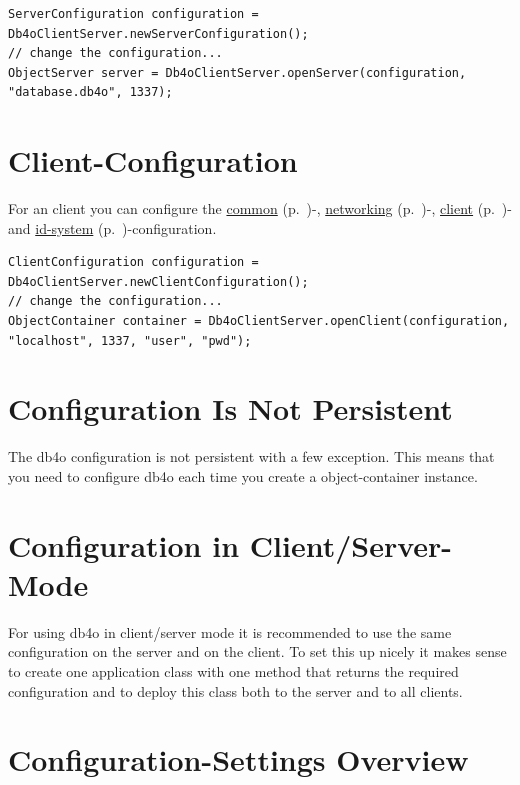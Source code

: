 \begin{lstlisting}
ServerConfiguration configuration = Db4oClientServer.newServerConfiguration();
// change the configuration...
ObjectServer server = Db4oClientServer.openServer(configuration, "database.db4o", 1337);
\end{lstlisting}

\section*{Client-Configuration}

For an client you can configure the \hyperref[ref:configuration-common-configuration]{common} (p.~\pageref{ref:configuration-common-configuration})-, \hyperref[ref:configuration-network-configuration]{networking} (p.~\pageref{ref:configuration-network-configuration})-, \hyperref[ref:configuration-client-configuration]{client} (p.~\pageref{ref:configuration-client-configuration})- and \hyperref[ref:configuration-id-system]{id-system} (p.~\pageref{ref:configuration-id-system})-configuration.

\begin{lstlisting}
ClientConfiguration configuration = Db4oClientServer.newClientConfiguration();
// change the configuration...
ObjectContainer container = Db4oClientServer.openClient(configuration, "localhost", 1337, "user", "pwd");
\end{lstlisting}

\section*{Configuration Is Not Persistent}

The db4o configuration is not persistent with a few exception. This means that you need to configure db4o each time you create a object-container instance.

\section*{Configuration in Client/Server-Mode}

For using db4o in client/server mode it is recommended to use the same configuration on the server and on the client. To set this up nicely it makes sense to create one application class with one method that returns the required configuration and to deploy this class both to the server and to all clients.

\section*{Configuration-Settings Overview}


